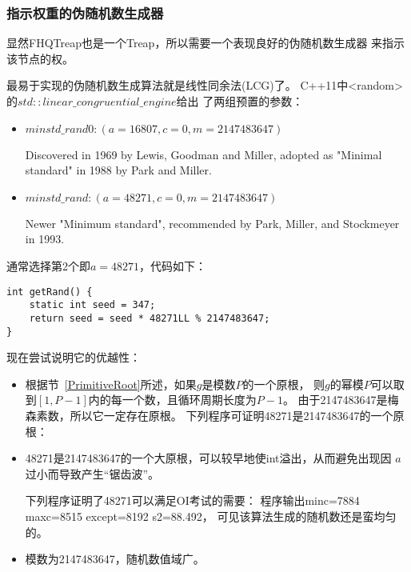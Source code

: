 \subsubsection{指示权重的伪随机数生成器}\label{WRG}

显然FHQTreap也是一个Treap，所以需要一个表现良好的伪随机数生成器
来指示该节点的权。

最易于实现的伪随机数生成算法就是线性同余法(LCG)了。
C++11中<random>的$std::linear\_congruential\_engine$给出
了两组预置的参数：
\begin{itemize}
	\item $minstd\_rand0:(a=16807, c=0, m=2147483647)$

	      Discovered in 1969 by Lewis, Goodman and Miller, adopted as
	      "Minimal standard" in 1988 by Park and Miller.
	\item $minstd\_rand:(a=48271, c=0, m=2147483647)$

	      Newer "Minimum standard", recommended by Park, Miller, and Stockmeyer in 1993.

\end{itemize}

通常选择第2个即$a=48271$，代码如下：

\begin{lstlisting}[title=minstd\_rand]
int getRand() {
    static int seed = 347;
    return seed = seed * 48271LL % 2147483647;
}
\end{lstlisting}

现在尝试说明它的优越性：

\begin{itemize}
	\item 根据节~\ref{PrimitiveRoot}所述，如果$g$是模数$P$的一个原根，
	      则$g$的幂模$P$可以取到$[1,P-1]$内的每一个数，且循环周期长度为$P-1$。
	      由于2147483647是梅森素数，所以它一定存在原根。
	      下列程序可证明48271是2147483647的一个原根：
	      
	\item 48271是2147483647的一个大原根，可以较早地使int溢出，从而避免出现因
	      $a$过小而导致产生``锯齿波''。

          下列程序证明了48271可以满足OI考试的需要：
          程序输出minc=7884 maxc=8515 except=8192 s2=88.492，
          可见该算法生成的随机数还是蛮均匀的。
    \item 模数为2147483647，随机数值域广。
\end{itemize}

